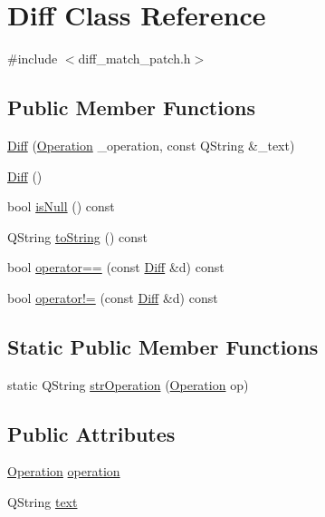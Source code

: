 \hypertarget{class_diff}{
\section{Diff Class Reference}
\label{class_diff}
}


{\ttfamily \#include $<$diff\_\-match\_\-patch.h$>$}

\subsection*{Public Member Functions}
\begin{DoxyCompactItemize}
\item 
\hyperlink{class_diff_a8fafc882c451d2b3768b0637aa0fe6b6}{Diff} (\hyperlink{diff__match__patch_8h_aa8f137f19095e0bdcf4f521e901f88bb}{Operation} \_\-operation, const QString \&\_\-text)
\item 
\hyperlink{class_diff_a6c572ea9bb134f23a593f56e0c92bae8}{Diff} ()
\item 
bool \hyperlink{class_diff_af06b43fba4ac4d642296a9e1f60a97cb}{isNull} () const 
\item 
QString \hyperlink{class_diff_ad2d625057737fb1304a7811d6184ef8b}{toString} () const 
\item 
bool \hyperlink{class_diff_ae3bb825450a577a92813370db37aa973}{operator==} (const \hyperlink{class_diff}{Diff} \&d) const 
\item 
bool \hyperlink{class_diff_ae527433d87f2a87c63ab2fec50a00a8e}{operator!=} (const \hyperlink{class_diff}{Diff} \&d) const 
\end{DoxyCompactItemize}
\subsection*{Static Public Member Functions}
\begin{DoxyCompactItemize}
\item 
static QString \hyperlink{class_diff_a922600ec44c726ba32675b33e0c52ac6}{strOperation} (\hyperlink{diff__match__patch_8h_aa8f137f19095e0bdcf4f521e901f88bb}{Operation} op)
\end{DoxyCompactItemize}
\subsection*{Public Attributes}
\begin{DoxyCompactItemize}
\item 
\hyperlink{diff__match__patch_8h_aa8f137f19095e0bdcf4f521e901f88bb}{Operation} \hyperlink{class_diff_a134b63b7f79fbb3596a42bb7b2a5140e}{operation}
\item 
QString \hyperlink{class_diff_a5aab41a87ff74a0f572962ede20d9f2d}{text}
\end{DoxyCompactItemize}


